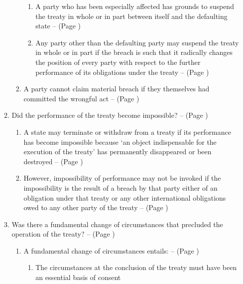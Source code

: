 \begin{enumerate}
\begin{enumerate}[resume]
\begin{enumerate}
\begin{enumerate}
                \item A party who has been especially affected has grounds to suspend the treaty in whole or in part between itself and the defaulting state --  (Page \pageref{VCLT Art 60})
                \item Any party other than the defaulting party may suspend the treaty in whole or in part if the breach is such that it radically changes the position of every party with respect to the further performance of its obligations under the treaty --  (Page \pageref{VCLT Art 60})
            \end{enumerate}
            \item A party cannot claim material breach if they themselves had committed the wrongful act --  (Page \pageref{case:[1997] ICJ Rep 7})
        \end{enumerate}
        \item Did the performance of the treaty become impossible? --  (Page \pageref{VCLT Art 61})
        \begin{enumerate}
            \item A state may terminate or withdraw from a treaty if its performance has become impossible because `an object indispensable for the execution of the treaty' has permanently disappeared or been destroyed --  (Page \pageref{VCLT Art 61})
            \item However, impossibility of performance may not be invoked if the impossibility is the result of a breach by that party either of an obligation under that treaty or any other international obligations owed to any other party of the treaty --  (Page \pageref{VCLT Art 61})
        \end{enumerate}
        \item Was there a fundamental change of circumstances that precluded the operation of the treaty? --  (Page \pageref{VCLT Art 62})
        \begin{enumerate}
            \item A fundamental change of circumstances entails: --  (Page \pageref{case:[1997] ICJ Rep 7})
            \begin{enumerate}
                \item The circumstances at the conclusion of the treaty must have been an essential basis of consent

\end{enumerate}
\end{enumerate}
\end{enumerate}
\end{enumerate}
